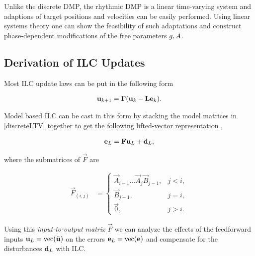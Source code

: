 Unlike the discrete DMP, the rhythmic DMP is a linear time-varying system and adaptions of target positions and velocities can be easily performed. Using linear systems theory one can show the feasibility of such adaptations and construct phase-dependent modifications of the free parameters $g,A$.

\subsection{Derivation of ILC Updates}

Most ILC update laws can be put in the following form

\begin{equation}
\begin{aligned}
\boldsymbol{\mathrm{u}}_{k+1} = \boldsymbol{\mathrm{\Gamma}}(\boldsymbol{\mathrm{u}}_{k} - \boldsymbol{\mathrm{L}}\boldsymbol{\mathrm{e}}_{k}).
\end{aligned}
\label{ILCupdateForm}
\end{equation}

\noindent Model based ILC can be cast in this form by stacking the model matrices in \eqref{discreteLTV} together to get the following lifted-vector representation \cite{Bristow06}, \cite{Schoellig12}

\begin{equation}
\begin{aligned}
\boldsymbol{\mathrm{e}}_L &= \boldsymbol{\mathrm{F}}\boldsymbol{\mathrm{u}}_L + \boldsymbol{\mathrm{d}}_L, \\
\end{aligned}
\label{liftedLTV}
\end{equation}

\noindent where the submatrices of $\vec{F}$ are

\begin{equation}
\begin{aligned}
\vec{F}_{(i,j)} &= \left \{
\begin{array}{cc}
\vec{A}_{i-1}\ldots \vec{A}_j \vec{B}_{j-1}, & j < i, \\ 
\vec{B}_{j-1}, & j = i, \\
\vec{0}, & j > i. 
\end{array} \right.
\end{aligned}
\label{Fmatrix}
\end{equation}

\noindent Using this \emph{input-to-output matrix} $\vec{F}$ we can analyze the effects of the feedforward inputs $\boldsymbol{\mathrm{u}}_L = \operatorname{vec}(\tilde{\boldsymbol{\mathrm{u}}})$ on the errors $\boldsymbol{\mathrm{e}}_L = \operatorname{vec}(\boldsymbol{\mathrm{e}})$ and compensate for the disturbances $\boldsymbol{\mathrm{d}}_L$ with ILC.

